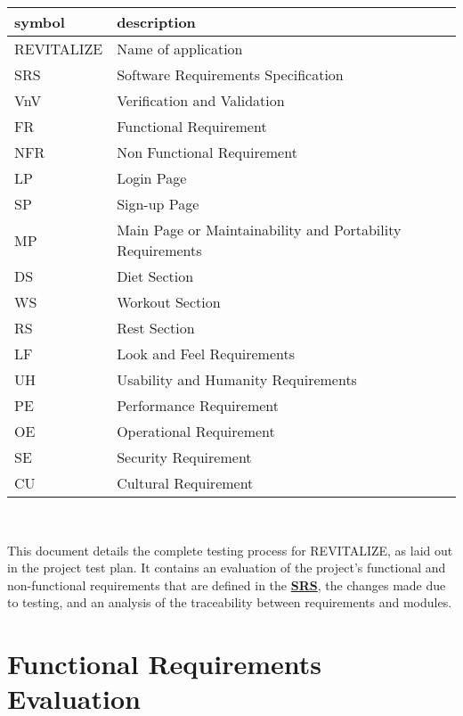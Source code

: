 \documentclass[12pt, titlepage]{article}
\begin{document}
\renewcommand{\arraystretch}{1.2}
\begin{tabular}{l l} 
\toprule		
\textbf{symbol} & \textbf{description}\\
\midrule 
REVITALIZE & Name of application\\
SRS & Software Requirements Specification\\
VnV & Verification and Validation\\
FR & Functional Requirement\\
NFR & Non Functional Requirement\\
LP & Login Page\\
SP & Sign-up Page\\
MP & Main Page or Maintainability and Portability Requirements\\
DS & Diet Section\\
WS & Workout Section\\
RS & Rest Section\\
LF & Look and Feel Requirements\\
UH & Usability and Humanity Requirements\\
PE & Performance Requirement\\
OE & Operational Requirement\\
SE & Security Requirement\\
CU & Cultural Requirement\\
\bottomrule
\end{tabular}\\

\newpage

\tableofcontents

\listoftables %

\listoffigures %

\newpage


This document details the complete testing process for REVITALIZE, as laid out in the project test plan. It contains an evaluation of the project’s functional and non-functional requirements that are defined in the \hyperlink{https://github.com/BillNguyen1999/REVITALIZE/blob/main/docs/SRS/SRS.pdf}{\textbf{SRS}}, the changes made due to testing, and an analysis of the traceability between requirements and modules.

\section{Functional Requirements Evaluation}
\end{document}
